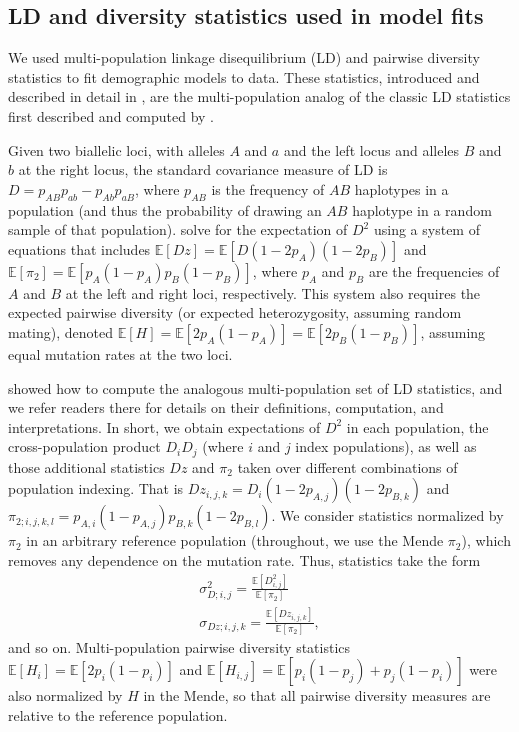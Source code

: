 \documentclass[]{article}
\newcommand{\E}{\mathbb{E}}
\begin{document}
\subsection{LD and diversity statistics used in model fits}
\label{sec:supp-ld-stats}

We used multi-population linkage disequilibrium (LD) and pairwise diversity
statistics to fit demographic models to data. These statistics, introduced and
described in detail in \citet{Ragsdale2019-nt}, are the multi-population analog
of the classic LD statistics first described and computed by
\citet{Hill1968-vu,Ohta1971-yd}.

Given two biallelic loci, with alleles $A$ and $a$ and the left locus and
alleles $B$ and $b$ at the right locus, the standard covariance measure of LD is
$D=p_{AB}p_{ab}-p_{Ab}p_{aB}$, where $p_{AB}$ is the frequency of $AB$
haplotypes in a population (and thus the probability of drawing an $AB$
haplotype in a random sample of that population). \citet{Hill1968-vu} solve for
the expectation of $D^2$ using a system of equations that includes $\E[Dz] =
\E[D(1-2p_A)(1-2p_B)]$ and $\E[\pi_2] = \E[p_A(1-p_A)p_B(1-p_B)]$, where $p_A$
and $p_B$ are the frequencies of $A$ and $B$ at the left and right loci,
respectively. This system also requires the expected pairwise diversity (or
expected heterozygosity, assuming random mating), denoted $\E[H] =
\E[2p_A(1-p_A)] = \E[2p_B(1-p_B)]$, assuming equal mutation rates at the two
loci.

\citet{Ragsdale2019-nt} showed how to compute the analogous multi-population
set of LD statistics, and we refer readers there for details on their
definitions, computation, and interpretations. In short, we obtain expectations
of $D^2$ in each population, the cross-population product $D_iD_j$ (where $i$
and $j$ index populations), as well as those additional statistics $Dz$ and
$\pi_2$ taken over different combinations of population indexing. That is
$Dz_{i, j, k} = D_i(1-2p_{A,j})(1-2p_{B,k})$ and
$\pi_{2;i,j,k,l}=p_{A,i}(1-p_{A,j})p_{B,k}(1-2p_{B,l})$. We consider statistics
normalized by $\pi_2$ in an arbitrary reference population (throughout, we use the Mende
$\pi_2$), which removes any dependence on the mutation rate. Thus, statistics
take the form 
\begin{equation}
\begin{split}
\sigma_{D;i,j}^2 = \frac{\E[D^2_{i,j}]}{\E[\pi_2]}\\
\sigma_{Dz;i,j,k}=\frac{\E[Dz_{i,j,k}]}{\E[\pi_2]},
\end{split}
\label{def_ld}
\end{equation}
and so on.
Multi-population pairwise diversity statistics $\E[H_i]=\E[2p_i(1-p_i)]$ and
$\E[H_{i,j}] = \E[p_i(1-p_j) + p_j(1-p_i)]$ were also normalized by $H$ in the
Mende, so that all pairwise diversity measures are relative to the reference
population.
\end{document}

